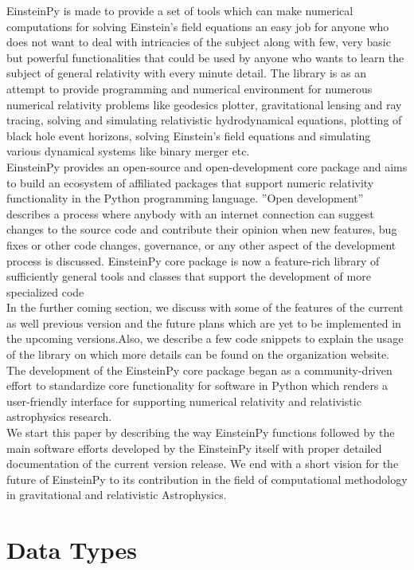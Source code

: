 \documentclass{aastex63}
\begin{document}
EinsteinPy is made to provide a set of tools which can make numerical computations for solving Einstein’s field equations an easy job for anyone who does not want to deal with intricacies of the subject along with few, very basic but powerful functionalities that could be used by anyone who wants to learn the subject of general relativity with every minute detail.
The library is as an attempt to provide programming and numerical environment for numerous numerical relativity problems like geodesics plotter, gravitational lensing and ray tracing, solving and simulating relativistic hydrodynamical equations, plotting of black hole event horizons, solving Einstein’s field equations and simulating various dynamical systems like binary merger etc.\\
EinsteinPy provides an open-source and open-development core package and aims to build an ecosystem of affiliated packages that support numeric relativity functionality in the Python programming language. ”Open development” describes a process where anybody with an internet connection can suggest changes to the source code and contribute their opinion when new features, bug fixes or other code changes, governance, or any other aspect of the development process is discussed. EinsteinPy core package is now a feature-rich library of sufficiently general tools and classes that support the development of more specialized code\\
In the further coming section, we discuss with some of the features of the current as well previous version and the future plans which are yet to be implemented in the upcoming versions.Also, we describe a few code snippets to explain the usage of the library on which more details can be found on the organization website. The development of the EinsteinPy core package began as a community-driven effort to standardize core functionality for software in Python which renders a user-friendly interface for supporting numerical relativity and relativistic astrophysics research.\\
We start this paper by describing the way EinsteinPy functions followed by the main software efforts developed by the EinsteinPy itself with proper detailed documentation of the current version release. We end with a short vision for the future of EinsteinPy to its contribution in the field of computational methodology in gravitational and relativistic Astrophysics.


\section{Data Types} \label{sec:datatypes}
\end{document}
